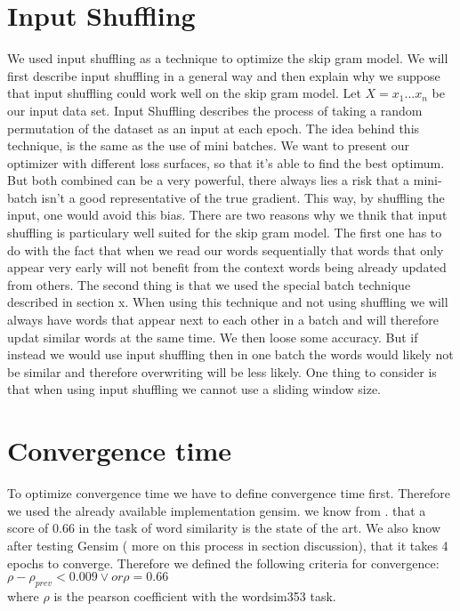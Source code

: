 \section{Input Shuffling}
We used input shuffling as a technique to optimize the skip gram model. We will first describe input shuffling in a general way and then explain why we suppose that input shuffling could work well on the skip gram model. 
Let $X = {x_1...x_n}$ be our input data set. Input Shuffling describes the process of taking a random permutation of the dataset as an input at each epoch. 
The idea behind this technique, is the same as the use of mini batches. We want to present our optimizer with different loss surfaces, so that it's able to find the best optimum. But both combined can be a very powerful, there always lies a risk that a mini-batch isn't a good representative of the true gradient. This way, by shuffling the input, one would avoid this bias.
There are two reasons why we thnik that input shuffling is particulary well suited for the skip gram model. The first one has to do with the fact that when we read our words sequentially that words that only appear very early will not benefit from the context words being already updated from others. The second thing is that we used the special batch technique described in section x.  When using this technique and not using shuffling we will always have words that appear next to each other in a batch and will therefore updat similar words at the same time. We then loose some accuracy. But if instead we would use input shuffling then in one batch the words would likely not be similar and therefore overwriting will be less likely. 
One thing to consider is that when using input shuffling we cannot use a sliding window size. 

\section{Convergence time} 
To optimize convergence time we have to define convergence time first. Therefore we used the already available implementation gensim. we know from \cite{intel}. that a score of $0.66$ in the task of word similarity is the state of the art. We also know after testing Gensim ( more on this process in section discussion), that it takes 4 epochs to converge. Therefore we defined the following criteria for convergence: \\
$\rho - \rho_{prev} < 0.009 \vee or \rho = 0.66$ \\
where $\rho$ is the pearson coefficient with the wordsim353 task. 

